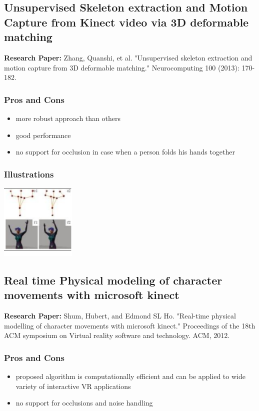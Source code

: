 \documentclass[a4paper,10pt]{report}
\begin{document}
\subsection{Unsupervised Skeleton extraction and Motion Capture from Kinect video via 3D deformable matching}
\textbf{Research Paper:} Zhang, Quanshi, et al. "Unsupervised skeleton extraction and motion capture from 3D deformable matching." Neurocomputing 100 (2013): 170-182.
\subsubsection{Pros and Cons}
\begin{itemize}
 \item more robust approach than others
 \item good performance
 \item no support for occlusion in case when a person folds his hands together
\end{itemize}
\subsubsection{Illustrations}\newline\newline
\includegraphics{./tech10.png}
\newline\newline


\subsection{Real time Physical modeling of character movements with microsoft kinect}
\textbf{Research Paper:} Shum, Hubert, and Edmond SL Ho. "Real-time physical modelling of character movements with microsoft kinect." Proceedings of the 18th ACM symposium on Virtual reality software and technology. ACM, 2012.
\subsubsection{Pros and Cons}
\begin{itemize}
 \item proposed algorithm is computationally efficient and can be applied to wide variety of interactive VR applications
 \item no support for occlusions and noise handling
\end{itemize}
\end{document}
